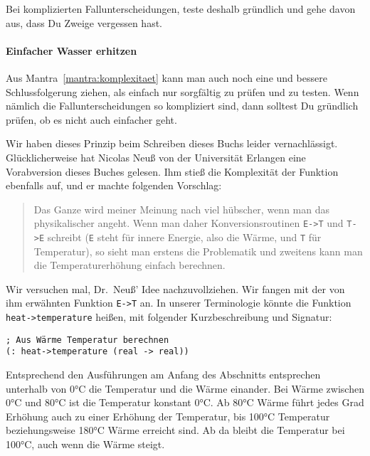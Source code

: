 \mantrakomplexitaet*

\noindent Bei komplizierten Fallunterscheidungen, teste deshalb gründlich und
gehe davon aus, dass Du Zweige vergessen hast.

\paragraph{Einfacher Wasser erhitzen}

Aus Mantra~\ref{mantra:komplexitaet} kann man auch noch eine und
bessere Schlussfolgerung ziehen, als einfach nur sorgfältig zu prüfen
und zu testen.  Wenn nämlich die Fallunterscheidungen so kompliziert
sind, dann solltest Du gründlich prüfen, ob es nicht auch einfacher
geht.

Wir haben dieses Prinzip beim Schreiben dieses Buchs leider
vernachlässigt.  Glücklicherweise hat Nicolas Neuß von der Universität
Erlangen eine Vorabversion dieses Buches gelesen.  Ihm stieß die
Komplexität der Funktion ebenfalls auf, und er machte folgenden
Vorschlag:
%
\begin{quote}
  Das Ganze wird meiner Meinung nach viel hübscher, wenn man das
  physikalischer angeht.  Wenn man daher Konversionsroutinen
  \verb|E->T| und \verb|T->E| schreibt (\texttt{E} steht für innere
  Energie, also die Wärme, und \texttt{T} für Temperatur), so sieht
  man erstens die Problematik und zweitens kann man die
  Temperaturerhöhung einfach berechnen.
\end{quote}
%
Wir versuchen mal, Dr.\ Neuß' Idee nachzuvollziehen.  Wir fangen mit
der von ihm erwähnten Funktion \verb|E->T| an.  In unserer
Terminologie könnte die Funktion \lstinline{heat->temperature} heißen,
mit folgender Kurzbeschreibung und Signatur:
%
\begin{lstlisting}
; Aus Wärme Temperatur berechnen
(: heat->temperature (real -> real))
\end{lstlisting}
%
Entsprechend den Ausführungen am Anfang des Abschnitts entsprechen
unterhalb von 0\si{\degree}C die Temperatur und die Wärme einander.  Bei Wärme
zwischen 0\si{\degree}C und 80\si{\degree}C ist die Temperatur konstant 0\si{\degree}C. Ab 80\si{\degree}C Wärme
führt jedes Grad Erhöhung auch zu einer Erhöhung der Temperatur, bis
100\si{\degree}C Temperatur beziehungsweise 180\si{\degree}C Wärme erreicht sind.  Ab da
bleibt die Temperatur bei 100\si{\degree}C, auch wenn die Wärme steigt.

